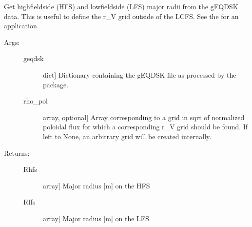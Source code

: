 \documentclass[letterpaper,10pt,english]{sphinxmanual}
\begin{document}

\begin{fulllineitems}
\label{\detokenize{aurora:aurora.grids_utils.get_HFS_LFS}}
Get high\sphinxhyphen{}field\sphinxhyphen{}side (HFS) and low\sphinxhyphen{}field\sphinxhyphen{}side (LFS) major radii from the g\sphinxhyphen{}EQDSK data. 
This is useful to define the r\_V grid outside of the LCFS. 
See the  for an application.
\begin{description}
\item[{Args:}] \leavevmode\begin{description}
\item[{geqdsk}] \leavevmode{[}dict{]}
Dictionary containing the g\sphinxhyphen{}EQDSK file as processed by the 
package.

\item[{rho\_pol}] \leavevmode{[}array, optional{]}
Array corresponding to a grid in sqrt of normalized poloidal flux for which a 
corresponding r\_V grid should be found. If left to None, an arbitrary grid will be 
created internally.

\end{description}

\item[{Returns:}] \leavevmode\begin{description}
\item[{Rhfs}] \leavevmode{[}array{]}
Major radius {[}m{]} on the HFS

\item[{Rlfs}] \leavevmode{[}array{]}
Major radius {[}m{]} on the LFS

\end{description}

\end{description}

\end{fulllineitems}

\end{document}
